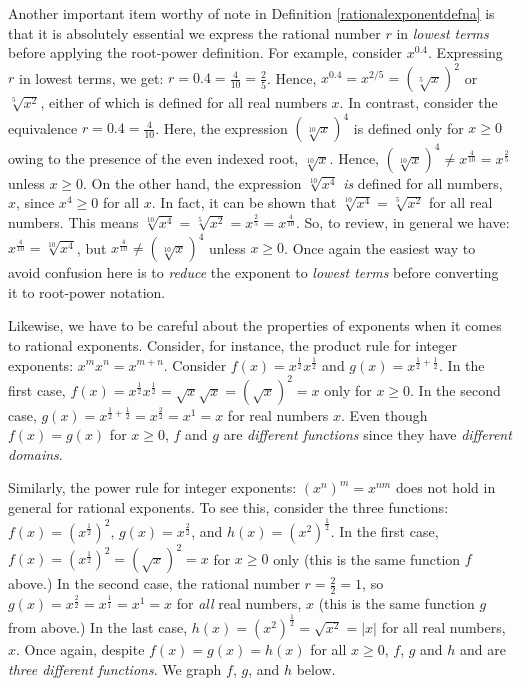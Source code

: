 \documentclass{ximera}
\begin{document}
Another important item worthy of note in Definition \ref {rationalexponentdefna} is that it is absolutely essential  we express the rational number $r$ in \textit{lowest terms} before applying the root-power definition.  For example, consider $x^{0.4}$. Expressing $r$ in lowest terms, we get:  $r = 0.4 = \frac{4}{10} = \frac{2}{5}$.  Hence,  $x^{0.4} = x^{2/5} = (\sqrt[5]{x})^2$ or $\sqrt[5]{x^2}$, either of which is defined for all real numbers $x$.  In contrast, consider the equivalence $r = 0.4 = \frac{4}{10}$.  Here, the expression $(\sqrt[10]{x})^4$ is defined only for $x \geq 0$ owing to the presence of the even indexed root, $\sqrt[10]{x}$.  Hence, $(\sqrt[10]{x})^4 \neq x^{\frac{4}{10}} = x^{\frac{2}{5}}$ unless $x \geq 0$.   On the other hand,  the expression $\sqrt[10]{x^4}$ \textit{is} defined for all numbers, $x$, since $x^4 \geq 0$ for all $x$. In fact,  it can be shown that $\sqrt[10]{x^4} = \sqrt[5]{x^2}$ for all real numbers.  This means  $\sqrt[10]{x^4} =  \sqrt[5]{x^2} = x^{\frac{2}{5}} = x^{\frac{4}{10}}$.   So, to review, in general we have: $x^{\frac{4}{10}} = \sqrt[10]{x^4}$, but $x^{\frac{4}{10}}   \neq \left(\sqrt[10]{x}\right)^{4}$ unless $x \geq 0$.  Once again the easiest way to avoid confusion here is to \textit{reduce} the exponent to \textit{lowest terms} before converting it to root-power notation.


Likewise, we have to be careful about the properties of exponents when it comes to rational exponents.   Consider, for instance, the product rule for integer exponents:  $x^{m} x^{n} = x^{m+n}$.  Consider $f(x) = x^{\frac{1}{2}} x^{\frac{1}{2}}$ and $g(x) = x^{\frac{1}{2} + \frac{1}{2}}$.  In the first case, $f(x) =  x^{\frac{1}{2}} x^{\frac{1}{2}} =\sqrt{x} \sqrt{x} = (\sqrt{x})^2 = x$ only for $x \geq 0$.   In the second case, $g(x) = x^{\frac{1}{2} + \frac{1}{2}} = x^{\frac{2}{2}} = x^{1} = x$ for  real numbers $x$. Even though $f(x) = g(x)$ for $x \geq 0$, $f$ and $g$ are \textit{different functions} since they have \textit{different domains}.  


Similarly,  the power rule for integer exponents:  $(x^n)^m = x^{nm}$ does not hold  in general for rational exponents. To see this,  consider the three functions: $f(x) = (x^{\frac{1}{2}} )^2$,  $g(x) = x^{\frac{2}{2}}$,  and $h(x) = (x^2)^{\frac{1}{2}}$. In the first case,  $f(x) = (x^{\frac{1}{2}})^2 = (\sqrt{x})^2 = x$ for $x \geq 0$ only (this is the same function $f$ above.)  In the second case,  the rational number $r = \frac{2}{2} = 1$, so $g(x) = x^{\frac{2}{2}} = x^{\frac{1}{1}} = x^{1} = x$ for \textit{all} real numbers, $x$ (this is the same function $g$ from above.)  In the last case,  $h(x) = (x^2)^{\frac{1}{2}} = \sqrt{x^2} = |x|$ for all real numbers, $x$. Once again, despite $f(x) = g(x) = h(x)$ for all $x \geq 0$,  $f$, $g$ and $h$ and are \textit{three different functions}.  We graph $f$, $g$, and $h$ below.  
\end{document}

